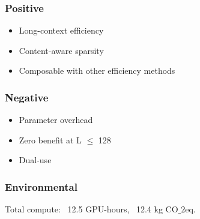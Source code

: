 \subsubsection{Positive}
\begin{itemize}
\item Long-context efficiency
\item Content-aware sparsity
\item Composable with other efficiency methods

\end{itemize}
\subsubsection{Negative}
\begin{itemize}
\item Parameter overhead
\item Zero benefit at L $\le$ 128
\item Dual-use

\end{itemize}
\subsubsection{Environmental}
Total compute: ~12.5 GPU-hours, ~12.4 kg CO$\_2$eq.

